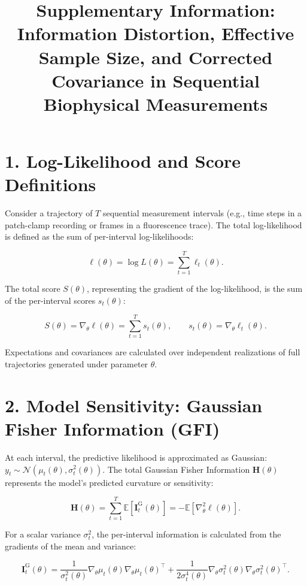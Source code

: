 \documentclass[11pt]{article}
\title{Supplementary Information: Information Distortion, Effective Sample Size, and Corrected Covariance in Sequential Biophysical Measurements}
\author{}
\date{}
\begin{document}
\maketitle

\section*{1. Log-Likelihood and Score Definitions}

Consider a trajectory of $T$ sequential measurement intervals (e.g., time steps in a patch-clamp recording or frames in a fluorescence trace). The total log-likelihood is defined as the sum of per-interval log-likelihoods:

\begin{equation}
\ell(\theta) = \log L(\theta) = \sum_{t=1}^T \ell_t(\theta).
\end{equation}

The total score $S(\theta)$, representing the gradient of the log-likelihood, is the sum of the per-interval scores $s_t(\theta)$:

\begin{equation}
S(\theta) = \nabla_\theta \ell(\theta) = \sum_{t=1}^T s_t(\theta), \qquad s_t(\theta) = \nabla_\theta \ell_t(\theta).
\end{equation}

Expectations and covariances are calculated over independent realizations of full trajectories generated under parameter $\theta$.

\section*{2. Model Sensitivity: Gaussian Fisher Information (GFI)}

At each interval, the predictive likelihood is approximated as Gaussian: $y_t \sim \mathcal{N}(\mu_t(\theta), \sigma_t^2(\theta))$. The total Gaussian Fisher Information $\mathbf{H}(\theta)$ represents the model's predicted curvature or sensitivity:

\begin{equation}
\mathbf{H}(\theta) = \sum_{t=1}^T \mathbb{E}\left[\mathbf{I}_t^{\mathrm{G}}(\theta)\right] = - \mathbb{E}\left[\nabla_\theta^2 \ell(\theta)\right].
\end{equation}

For a scalar variance $\sigma_t^2$, the per-interval information is calculated from the gradients of the mean and variance:

\begin{equation}
\mathbf I_t^{\mathrm{G}}(\theta) = \frac{1}{\sigma_t^2(\theta)} \nabla_\theta \mu_t(\theta) \nabla_\theta \mu_t(\theta)^\top + \frac{1}{2\sigma_t^4(\theta)} \nabla_\theta \sigma_t^2(\theta) \nabla_\theta \sigma_t^2(\theta)^\top.
\end{equation}
\end{document}
